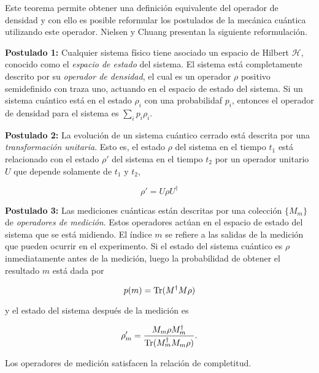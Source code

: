 Este teorema  permite obtener una definición equivalente del operador de densidad y con ello es posible reformular los postulados de la mecánica cuántica utilizando este operador. Nielsen y Chuang {\cite{nielsen_chuang_2010}}presentan la siguiente reformulación.


\setlength{\leftskip}{1cm}

 \textbf{Postulado 1:} Cualquier sistema físico tiene asociado un espacio de Hilbert $\mathcal{H}$, conocido como el \textit{espacio de estado} del sistema. El sistema está completamente descrito por su \textit{operador de densidad}, el cual es un operador $\rho$ positivo semidefinido con traza uno, actuando en el espacio de estado del sistema. Si un sistema cuántico está en el estado $\rho_i$ con una probabilidaf $p_i$, entonces el operador de densidad para el sistema es $\sum_{i}p_i\rho_i$.


\textbf{Postulado 2:} La evolución de un sistema cuántico cerrado está descrita por una \textit{transformación unitaria}. Esto es, el estado $\rho$ del sistema en el tiempo $t_1$ está relacionado con el estado $\rho'$ del sistema en el tiempo $t_2$ por un operador unitario $U$ que depende solamente de $t_1$ y $t_2$, 

\begin{equation}\label{postulado 2}
\rho'=U\rho U^{\dagger}
\end{equation}


\textbf{Postulado 3:} Las mediciones cuánticas están descritas por una colección $\{M_m\}$ de \textit{operadores de medición}. Estos operadores actúan en el espacio de estado del sistema que se está midiendo. El índice $m$ se refiere a las salidas de la medición que pueden ocurrir en el experimento. Si el estado del sistema cuántico es $\rho$ inmediatamente antes de la medición, luego la probabilidad de obtener el resultado $m$ está dada por

\begin{equation}\label{probaility3postulate}
	p(m)={\rm Tr}(M^\dagger M \rho)
\end{equation}


y el estado del sistema después de la medición es 


\begin{equation}\label{state3postulate}
	\rho_m'=\dfrac{M_m\rho M_m^\dagger}{{\rm Tr}(M_m^\dagger M_m \rho)}.
\end{equation}


Los operadores de medición satisfacen la relación de completitud.

